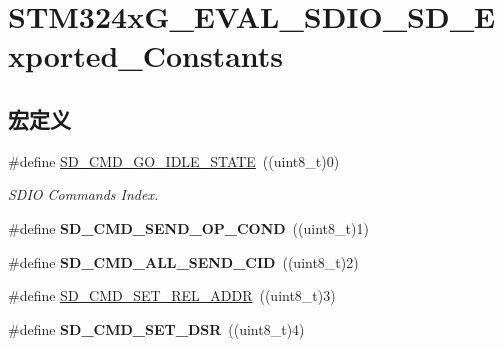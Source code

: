 \hypertarget{group___s_t_m324x_g___e_v_a_l___s_d_i_o___s_d___exported___constants}{}\section{S\+T\+M324x\+G\+\_\+\+E\+V\+A\+L\+\_\+\+S\+D\+I\+O\+\_\+\+S\+D\+\_\+\+Exported\+\_\+\+Constants}
\label{group___s_t_m324x_g___e_v_a_l___s_d_i_o___s_d___exported___constants}
\subsection*{宏定义}
\begin{DoxyCompactItemize}
\item 
\#define \hyperlink{group___s_t_m324x_g___e_v_a_l___s_d_i_o___s_d___exported___constants_ga9d34df51b7f169e0be94fea97d0c1639}{S\+D\+\_\+\+C\+M\+D\+\_\+\+G\+O\+\_\+\+I\+D\+L\+E\+\_\+\+S\+T\+A\+TE}~((uint8\+\_\+t)0)\hypertarget{group___s_t_m324x_g___e_v_a_l___s_d_i_o___s_d___exported___constants_ga9d34df51b7f169e0be94fea97d0c1639}{}\label{group___s_t_m324x_g___e_v_a_l___s_d_i_o___s_d___exported___constants_ga9d34df51b7f169e0be94fea97d0c1639}

\begin{DoxyCompactList}\small\item\em S\+D\+IO Commands Index. \end{DoxyCompactList}\item 
\#define {\bfseries S\+D\+\_\+\+C\+M\+D\+\_\+\+S\+E\+N\+D\+\_\+\+O\+P\+\_\+\+C\+O\+ND}~((uint8\+\_\+t)1)\hypertarget{group___s_t_m324x_g___e_v_a_l___s_d_i_o___s_d___exported___constants_ga74eabc4acadc80ad0242d52942c8d76a}{}\label{group___s_t_m324x_g___e_v_a_l___s_d_i_o___s_d___exported___constants_ga74eabc4acadc80ad0242d52942c8d76a}

\item 
\#define {\bfseries S\+D\+\_\+\+C\+M\+D\+\_\+\+A\+L\+L\+\_\+\+S\+E\+N\+D\+\_\+\+C\+ID}~((uint8\+\_\+t)2)\hypertarget{group___s_t_m324x_g___e_v_a_l___s_d_i_o___s_d___exported___constants_ga3d9d3a1da54a30d81e1d2a9c6a2d9b4f}{}\label{group___s_t_m324x_g___e_v_a_l___s_d_i_o___s_d___exported___constants_ga3d9d3a1da54a30d81e1d2a9c6a2d9b4f}

\item 
\#define \hyperlink{group___s_t_m324x_g___e_v_a_l___s_d_i_o___s_d___exported___constants_gaa7e0f4e84001656eac62b41179376a25}{S\+D\+\_\+\+C\+M\+D\+\_\+\+S\+E\+T\+\_\+\+R\+E\+L\+\_\+\+A\+D\+DR}~((uint8\+\_\+t)3)
\item 
\#define {\bfseries S\+D\+\_\+\+C\+M\+D\+\_\+\+S\+E\+T\+\_\+\+D\+SR}~((uint8\+\_\+t)4)\hypertarget{group___s_t_m324x_g___e_v_a_l___s_d_i_o___s_d___exported___constants_ga89e890726a09716bb1a5c6ef6d0d3d90}{}\label{group___s_t_m324x_g___e_v_a_l___s_d_i_o___s_d___exported___constants_ga89e890726a09716bb1a5c6ef6d0d3d90}


\end{DoxyCompactItemize}
